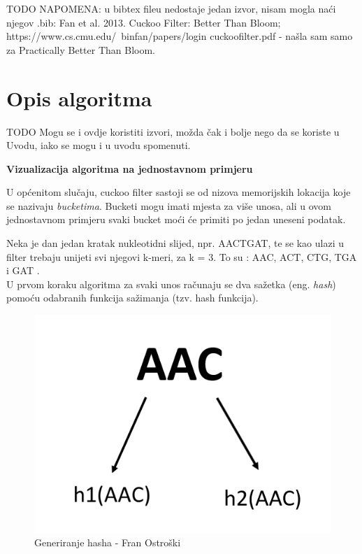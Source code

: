 \documentclass[times, utf8, seminar, numeric]{fer}
\begin{document}
TODO NAPOMENA: u bibtex fileu nedostaje jedan izvor, nisam mogla naći njegov .bib: 
Fan et al. 2013. Cuckoo Filter: Better Than Bloom; https://www.cs.cmu.edu/~binfan/papers/login cuckoofilter.pdf - našla sam samo za Practically Better Than Bloom.

\chapter{Opis algoritma}
TODO Mogu se i ovdje koristiti izvori, možda čak i bolje nego da se koriste u Uvodu, iako se mogu i u uvodu spomenuti.

\begin{flushleft}
\textbf{Vizualizacija algoritma na jednostavnom primjeru}
\end{flushleft}


U općenitom slučaju, cuckoo filter sastoji se od nizova memorijskih lokacija koje se nazivaju \textit{bucketima}. Bucketi mogu imati mjesta za više unosa, ali u ovom jednostavnom primjeru svaki bucket moći će primiti  po jedan uneseni podatak.

Neka je dan jedan kratak nukleotidni slijed, npr. AACTGAT, te se kao ulazi u filter trebaju unijeti svi njegovi k-meri, za k = 3. To su : AAC, ACT, CTG, TGA i GAT . \\
U prvom koraku algoritma za svaki unos računaju se dva sažetka (eng. \textit{hash}) pomoću odabranih funkcija sažimanja (tzv. hash funkcija).

\begin{figure}[H]
  \centering
  \setlength{\intextsep}{5pt}
  \includegraphics[scale = 0.75]{images/hashing.png}
  \caption{Generiranje hasha - Fran Ostroški}
  \label{fig_hash}
\end{figure}
\end{document}

